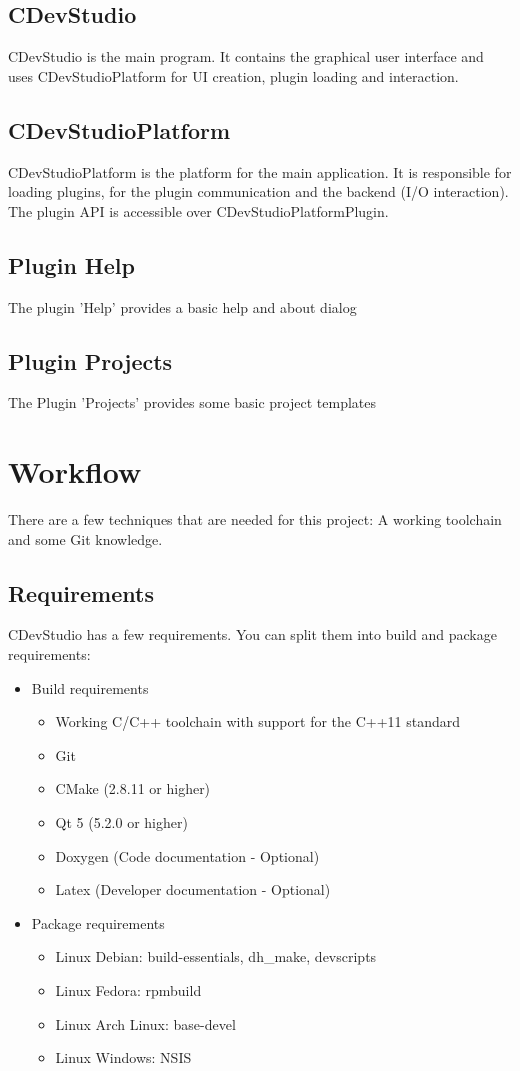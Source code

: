 \documentclass{article}
\begin{document}
\subsection{CDevStudio}
CDevStudio is the main program. It contains the graphical user interface and uses CDevStudioPlatform for UI creation, plugin loading and interaction.

\subsection{CDevStudioPlatform}
CDevStudioPlatform is the platform for the main application. It is responsible for loading plugins, for the plugin communication and the backend (I/O interaction). The plugin API is accessible over CDevStudioPlatformPlugin.

\subsection{Plugin Help}
The plugin 'Help' provides a basic help and about dialog

\subsection{Plugin Projects}
The Plugin 'Projects' provides some basic project templates

\section{Workflow}
There are a few techniques that are needed for this project: A working toolchain and some Git knowledge.

\subsection{Requirements}
CDevStudio has a few requirements. You can split them into build and package requirements:

\begin{itemize}
	\item Build requirements
	\begin{itemize}
		\item Working C/C++ toolchain with support for the C++11 standard
		\item Git
		\item CMake (2.8.11 or higher)
		\item Qt 5 (5.2.0 or higher)
		\item Doxygen (Code documentation - Optional)
		\item Latex (Developer documentation - Optional)
	\end{itemize}
	\item Package requirements
	\begin{itemize}
		\item Linux Debian: build-essentials, dh_make, devscripts
		\item Linux Fedora: rpmbuild
		\item Linux Arch Linux: base-devel
		\item Linux Windows: NSIS
	\end{itemize}
\end{itemize}
\end{document}
